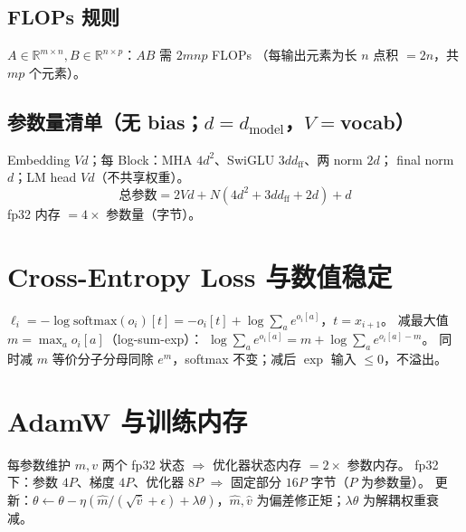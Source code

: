 \documentclass[12pt]{ctexart}
\begin{document}
\subsection{FLOPs 规则}
$A\in\mathbb{R}^{m\times n},B\in\mathbb{R}^{n\times p}$：$AB$ 需 $2mnp$ FLOPs
（每输出元素为长 $n$ 点积 $=2n$，共 $mp$ 个元素）。

\subsection{参数量清单（无 bias；$d=d_{\text{model}}$，$V=$vocab）}
Embedding $Vd$；每 Block：MHA $4d^2$、SwiGLU $3dd_{\text{ff}}$、两 norm $2d$；
final norm $d$；LM head $Vd$（不共享权重）。
\[
\text{总参数}=2Vd+N(4d^2+3dd_{\text{ff}}+2d)+d
\]
fp32 内存 $=4\times$ 参数量（字节）。

\section{Cross-Entropy Loss 与数值稳定}

$\ell_i=-\log\text{softmax}(o_i)[t]=-o_i[t]+\log\sum_a e^{o_i[a]}$，$t=x_{i+1}$。
减最大值 $m=\max_a o_i[a]$（log-sum-exp）：
$\log\sum_a e^{o_i[a]}=m+\log\sum_a e^{o_i[a]-m}$。
同时减 $m$ 等价分子分母同除 $e^m$，softmax 不变；减后 $\exp$ 输入 $\le0$，不溢出。

\section{AdamW 与训练内存}

每参数维护 $m,v$ 两个 fp32 状态 $\Rightarrow$ 优化器状态内存 $=2\times$ 参数内存。
fp32 下：参数 $4P$、梯度 $4P$、优化器 $8P$ $\Rightarrow$ 固定部分 $16P$ 字节（$P$ 为参数量）。
更新：$\theta\leftarrow\theta-\eta(\hat m/(\sqrt{\hat v}+\epsilon)+\lambda\theta)$，$\hat m,\hat v$ 为偏差修正矩；$\lambda\theta$ 为解耦权重衰减。
\end{document}
